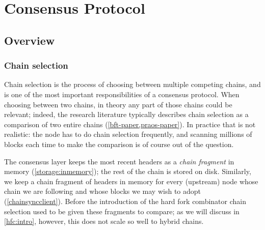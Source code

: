 \chapter{Consensus Protocol}
\label{consensus}


%
%

\section{Overview}

\subsection{Chain selection}
\label{consensus:overview:chainsel}

Chain selection is the process of choosing between multiple competing chains,
and is one of the most important responsibilities of a consensus protocol. When
choosing between two chains, in theory any part of those chains could be
relevant; indeed, the research literature typically describes chain selection as
a comparison of two entire chains (\cref{bft-paper,praos-paper}). In practice
that is not realistic: the node has to do chain selection frequently, and
scanning millions of blocks each time to make the comparison is of course out of
the question.

The consensus layer keeps the most recent headers as a \emph{chain fragment}
in memory (\cref{storage:inmemory}); the rest of the chain is stored on disk.
Similarly, we keep a chain fragment of headers in memory for every (upstream)
node whose chain we are following and whose blocks we may wish to adopt
(\cref{chainsyncclient}). Before the introduction of the hard fork combinator
chain selection used to be given these fragments to compare; as we will discuss
in \cref{hfc:intro}, however, this does not scale so well to hybrid chains.

